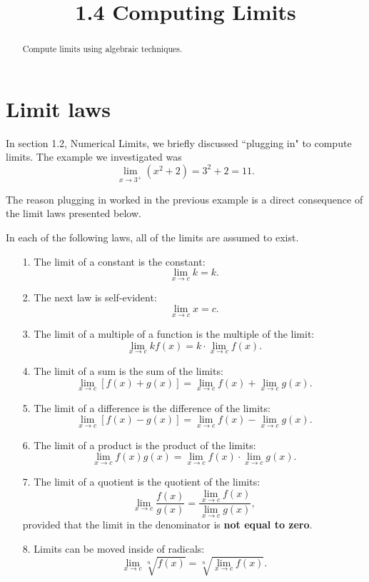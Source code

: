 \documentclass[handout]{ximera}
\title{1.4 Computing Limits}
\begin{document}
\begin{abstract}
Compute limits using algebraic techniques.
\end{abstract}

\maketitle


\section{Limit laws}
 
In section 1.2, Numerical Limits, we briefly discussed ``plugging in" to compute limits.
 The example we investigated was
 \[
 \lim_{x \to 3^+} \left(x^2 + 2 \right) = 3^2 + 2 = 11.
 \]

The reason plugging in worked in the previous example is a direct consequence of the limit laws presented below.
 
In each of the following laws, all of the limits are assumed to exist.

\begin{enumerate}

\item[1.]  
The limit of a constant is the constant:
 \[
 \lim_{x \to c} k = k.
 \]
 
\item[2.]
 The next law is self-evident:
 \[
 \lim_{x \to c} x = c.
 \]
 
 \item[3.]
 The limit of a multiple of a function is the multiple of the limit:
 \[
 \lim_{x \to c} kf(x) = k \cdot \lim_{x \to c} f(x). 
 \]
 
 \item[4.]
 The limit of a sum is the sum of the limits:
 \[
 \lim_{x \to c} \left[f(x) + g(x) \right] = \lim_{x \to c} f(x) + \lim_{x \to c} g(x). 
 \]
 
\item[5.]
 The limit of a difference is the difference of the limits:
 \[
 \lim_{x \to c} \left[f(x) - g(x) \right] = \lim_{x \to c} f(x) - \lim_{x \to c} g(x). 
 \]
 
\item[6.]
 The limit of a product is the product of the limits:
 \[
 \lim_{x \to c} f(x) g(x) = \lim_{x \to c} f(x) \cdot \lim_{x \to c} g(x). 
 \]


\item[7.]
 The limit of a quotient is the quotient of the limits:
 \[
 \lim_{x \to c} \frac{f(x)}{g(x)} = \frac{\lim_{x \to c} f(x)}{\lim_{x \to c} g(x)}, 
 \]
 provided that the limit in the denominator is \textbf{not equal to zero}.
 
 \item[8.]
 Limits can be moved inside of radicals:
 \[
 \lim_{x \to c} \sqrt[n]{f(x)} = \sqrt[n]{\lim_{x \to c} f(x)}. 
 \]

\end{enumerate}
\end{document}

